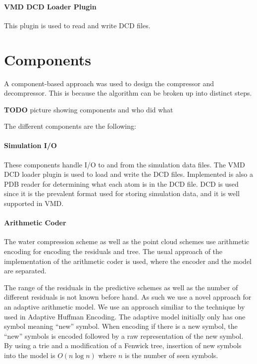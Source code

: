 \documentclass[a4paper]{report}
\newcommand{\todo}{\textbf{TODO} }
\begin{document}
\paragraph{VMD DCD Loader Plugin}
This plugin is used to read and write DCD files. \citep{vmd}


\section{Components}
\label{sec:components}

A component-based approach was used to design the compressor and
decompressor. This is because the algorithm can be broken up into distinct
steps.

\todo picture showing components and who did what

The different components are the following:

\paragraph{Simulation I/O}

These components handle I/O to and from the simulation data files. The VMD DCD
loader plugin is used to load and write the DCD files. Implemented is also a
PDB reader for determining what each atom is in the DCD file. DCD is used
since it is the prevalent format used for storing simulation data, and it is
well supported in VMD.


\paragraph{Arithmetic Coder}

The water compression scheme as well as the point cloud schemes use arithmetic
encoding for encoding the residuals and tree. The usual approach of the
implementation of the arithmetic coder is used, where the encoder and the
model are separated.

The range of the residuals in the predictive schemes as well as the number of
different residuals is not known before hand. As such we use a novel approach
for an adaptive arithmetic model. We use an approach similiar to the technique
by \citep{cormack1984algorithms} used in Adaptive Huffman Encoding. The
adaptive model initially only has one symbol meaning ``new'' symbol. When
encoding if there is a new symbol, the ``new'' symbols is encoded followed by
a raw representation of the new symbol. By using a trie and a modification of
a Fenwick tree, insertion of new symbols into the model is $O(n \log n)$ where
$n$ is the number of seen symbols.
\end{document}
